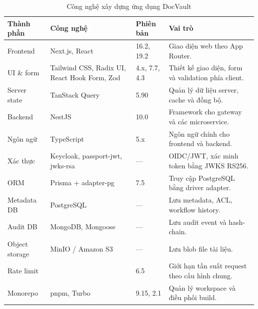 \begin{table}[H]
\centering
\small
\caption{Công nghệ xây dựng ứng dụng DocVault}
\label{tab:tech-stack-app}
\begin{tabularx}{\textwidth}{p{}p{}p{}Y}
\toprule
\textbf{Thành phần} & \textbf{Công nghệ} & \textbf{Phiên bản} & \textbf{Vai trò} \\
\midrule
Frontend & Next.js, React & 16.2, 19.2 & Giao diện web theo App Router. \\
UI \& form & Tailwind CSS, Radix UI, React Hook Form, Zod & 4.x, 7.7, 4.3 & Thiết kế giao diện, form và validation phía client. \\
Server state & TanStack Query & 5.90 & Quản lý dữ liệu server, cache và đồng bộ. \\
Backend & NestJS & 10.0 & Framework cho gateway và các microservice. \\
Ngôn ngữ & TypeScript & 5.x & Ngôn ngữ chính cho frontend và backend. \\
Xác thực & Keycloak, passport-jwt, jwks-rsa & --- & OIDC/JWT, xác minh token bằng JWKS RS256. \\
ORM & Prisma + adapter-pg & 7.5 & Truy cập PostgreSQL bằng driver adapter. \\
Metadata DB & PostgreSQL & --- & Lưu metadata, ACL, workflow history. \\
Audit DB & MongoDB, Mongoose & --- & Lưu audit event và hash-chain. \\
Object storage & MinIO / Amazon S3 & --- & Lưu blob file tài liệu. \\
Rate limit &  & 6.5 & Giới hạn tần suất request theo cấu hình chung. \\
Monorepo & pnpm, Turbo & 9.15, 2.1 & Quản lý workspace và điều phối build. \\
\bottomrule
\end{tabularx}
\end{table}

